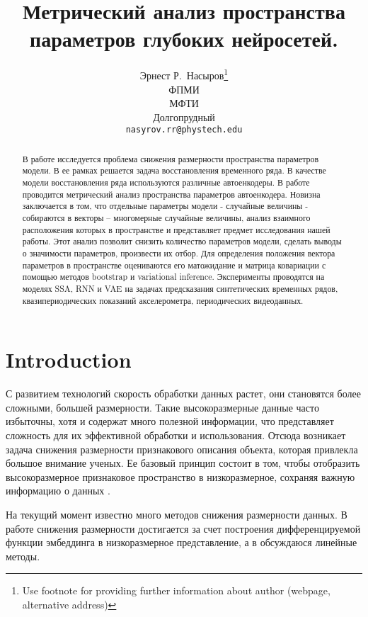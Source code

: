 \documentclass{article}
\title{Метрический анализ пространства параметров глубоких нейросетей.}
\author{Эрнест Р.~Насыров\thanks{Use footnote for providing further
		information about author (webpage, alternative
		address)} \\
	ФПМИ\\
	МФТИ\\
	Долгопрудный\\
	\texttt{nasyrov.rr@phystech.edu} \\
    }
\begin{document}
\maketitle

\begin{abstract}
В работе исследуется проблема снижения размерности пространства параметров модели. В ее рамках решается задача восстановления временного ряда. В качестве модели восстановления ряда используются различные автоенкодеры. В работе проводится метрический анализ пространства параметров автоенкодера. Новизна заключается в том, что отдельные параметры модели - случайные величины - собираются в векторы – многомерные случайные величины, анализ взаимного расположения которых в пространстве и представляет предмет исследования нашей работы. Этот анализ позволит снизить количество параметров модели, сделать выводы о значимости параметров, произвести их отбор. Для определения положения вектора параметров в пространстве оцениваются его матожидание и матрица ковариации с помощью методов bootstrap и variational inference. Эксперименты проводятся на моделях SSA, RNN и VAE на задачах предсказания синтетических временных рядов, квазипериодических показаний акселерометра, периодических видеоданных.
\end{abstract}




\section{Introduction}


С развитием технологий скорость обработки данных растет, они становятся более сложными, большей размерности. Такие высокоразмерные данные часто избыточны, хотя и содержат много полезной информации, что представляет сложность для их эффективной обработки и использования. Отсюда возникает задача снижения размерности признакового описания объекта, которая привлекла большое внимание ученых. Ее базовый принцип состоит в том, чтобы отобразить высокоразмерное признаковое пространство в низкоразмерное, сохраняя важную информацию о данных \citep{jia2022feature}.

На текущий момент известно много методов снижения размерности данных. В работе \citep{ornek2019nonlinear} снижения размерности достигается за счет построения дифференцируемой функции эмбеддинга в низкоразмерное представление, а в \citep{cunningham2014dimensionality} обсуждаюся линейные методы. 
\end{document}

